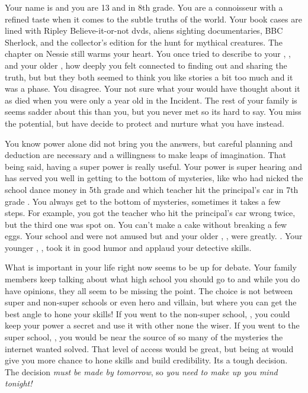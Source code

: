 \documentclass[char]{LRSguildcamp1}
\begin{document}
\name{\cTween{}}



Your name is \cTween{\intro} and you are 13 and in 8th grade. You are a connoisseur with a refined taste when it comes to the subtle truths of the world. Your book cases are lined with Ripley Believe-it-or-not dvds, aliens sighting documentaries,  BBC Sherlock, and the collector's edition for the hunt for mythical creatures. The chapter on Nessie still warms your heart. You once tried to describe to your \cArchitect{\parent}, \cArchitect{}, and your older \cTeen{\sibling}, \cTeen{} how deeply you felt connected to finding out and sharing the truth, but but they both seemed to think you like stories a bit too much and it was a phase. You disagree. Your not sure what your \cAS{\parent} would have thought about it as \cAS{\they} died when you were only a year old in the \pCityO{} Incident. The rest of your family is seems sadder about this than you, but you never met \cAS{\them} so its hard to say. You miss the potential, but have decide to protect and nurture what you have instead.


You know power alone did not bring you the answers, but careful planning and deduction are necessary and a willingness to make leaps of imagination. That being said, having a super power is really useful. Your power is super hearing and has served you well in getting to the bottom of mysteries, like who had nicked the school dance money in 5th grade and which teacher hit the principal's car in 7th grade . You always get to the bottom of mysteries, sometimes it takes a few steps. For example, you got the teacher who hit the principal's car wrong twice, but the third one was spot on. You can't make a cake without breaking a few eggs. Your school and \cArchitect{\parent} were not amused but \cGrandma{} and your older \cOldest{\uncle}, \cOldest{}, were greatly. \cYoungest{}. Your younger , \cYoungest{}, took it in good humor and applaud your detective skills.


What is important in your life right now seems to be up for debate. Your family members keep talking about what high school you should go to and while you do have opinions, they all seem to be missing the point. The choice is not between super and non-super schools or even hero and villain, but where you can get the best angle to hone your skills! If you went to the non-super school, \pNormalSchool{}, you could keep your power a secret and use it with other none the wiser. If you went to the super school, \pSuperSchool{}, you would be near the source of so many of the mysteries the internet wanted solved. That level of access would be great, but being at \pNormalSchool{} would give you more chance to hone skills and build credibility. Its a tough decision. The decision \textsl{must be made by tomorrow}, so \textit{you need to make up you mind tonight!}
\end{document}
